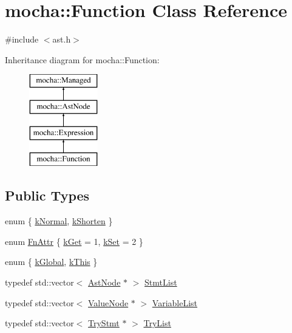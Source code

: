 \hypertarget{classmocha_1_1_function}{
\section{mocha::Function Class Reference}
\label{classmocha_1_1_function}
}


{\ttfamily \#include $<$ast.h$>$}

Inheritance diagram for mocha::Function:\begin{figure}[H]
\begin{center}
\leavevmode
\includegraphics[height=4.000000cm]{classmocha_1_1_function}
\end{center}
\end{figure}
\subsection*{Public Types}
\begin{DoxyCompactItemize}
\item 
enum \{ \hyperlink{classmocha_1_1_function_ad3b7db514f20142b0f64c5d3372daed6a3442707a280dc1acb3f6f717ddbbaeb4}{kNormal}, 
\hyperlink{classmocha_1_1_function_ad3b7db514f20142b0f64c5d3372daed6a4e4f72b8c9a543eeef0c7d5692a48596}{kShorten}
 \}
\item 
enum \hyperlink{classmocha_1_1_function_a73818727e95b7e36aa1b57c65a0a596d}{FnAttr} \{ \hyperlink{classmocha_1_1_function_a73818727e95b7e36aa1b57c65a0a596da2606fefe5b143e4becdb81d4c7dbc7e8}{kGet} =  1, 
\hyperlink{classmocha_1_1_function_a73818727e95b7e36aa1b57c65a0a596dab0c1505e9087e0afd69e7fb963571df5}{kSet} =  2
 \}
\item 
enum \{ \hyperlink{classmocha_1_1_function_ab8d67b714552a9d8dfb317bedc5393efadca11b20d09a709bb7edccd46712d608}{kGlobal}, 
\hyperlink{classmocha_1_1_function_ab8d67b714552a9d8dfb317bedc5393efaf7567a4bbb15db601bca4d888cfd0661}{kThis}
 \}
\item 
typedef std::vector$<$ \hyperlink{classmocha_1_1_ast_node}{AstNode} $\ast$ $>$ \hyperlink{classmocha_1_1_function_a5c4a48ede908b355b4f13a8f1d585707}{StmtList}
\item 
typedef std::vector$<$ \hyperlink{classmocha_1_1_value_node}{ValueNode} $\ast$ $>$ \hyperlink{classmocha_1_1_function_a243702678d29f0cfd91913838c1fb38c}{VariableList}
\item 
typedef std::vector$<$ \hyperlink{classmocha_1_1_try_stmt}{TryStmt} $\ast$ $>$ \hyperlink{classmocha_1_1_function_a9991b3d8362e4a8889c4b50d930d88ce}{TryList}
\end{DoxyCompactItemize}
